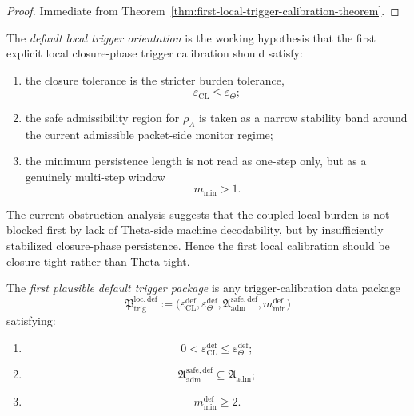 \begin{proof}
Immediate from Theorem~\ref{thm:first-local-trigger-calibration-theorem}.
\end{proof}



\begin{definition}
\label{def:default-local-trigger-orientation}
The \emph{default local trigger orientation} is the working hypothesis that the first explicit local closure-phase trigger calibration should satisfy:
\begin{enumerate}
    \item the closure tolerance is the stricter burden tolerance,
    \[
    \varepsilon_{\mathrm{CL}} \le \varepsilon_{\Theta};
    \]
    \item the safe admissibility region for \(\rho_A\) is taken as a narrow stability band around the current admissible packet-side monitor regime;
    \item the minimum persistence length is not read as one-step only, but as a genuinely multi-step window
    \[
    m_{\min}>1.
    \]
\end{enumerate}
\end{definition}

\begin{remark}
\label{rem:why-closure-tolerance-should-be-stricter-first}
The current obstruction analysis suggests that the coupled local burden is not blocked first by lack of Theta-side machine decodability, but by insufficiently stabilized closure-phase persistence.
Hence the first local calibration should be closure-tight rather than Theta-tight.
\end{remark}

\begin{definition}
\label{def:first-plausible-default-trigger-package}
The \emph{first plausible default trigger package} is any trigger-calibration data package
\[
\mathfrak{P}_{\mathrm{trig}}^{\mathrm{loc,def}}
:=
\bigl(
\varepsilon_{\mathrm{CL}}^{\mathrm{def}},
\varepsilon_{\Theta}^{\mathrm{def}},
\mathfrak{A}_{\mathrm{adm}}^{\mathrm{safe,def}},
 m_{\min}^{\mathrm{def}}
\bigr)
\]
satisfying:
\begin{enumerate}
    \item
    \[
    0<\varepsilon_{\mathrm{CL}}^{\mathrm{def}} \le \varepsilon_{\Theta}^{\mathrm{def}};
    \]
    \item
    \[
    \mathfrak{A}_{\mathrm{adm}}^{\mathrm{safe,def}}
    \subseteq
    \mathfrak{A}_{\mathrm{adm}};
    \]
    \item
    \[
    m_{\min}^{\mathrm{def}}\ge 2.
    \]
\end{enumerate}
\end{definition}

